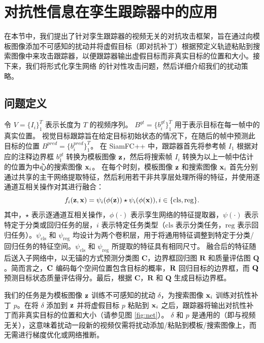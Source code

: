 \section{对抗性信息在孪生跟踪器中的应用}
在本节中，我们提出了针对孪生跟踪器的视频无关的对抗攻击框架，旨在通过向模板图像添加不可感知的扰动并将虚假目标（即对抗补丁）根据预定义轨迹粘贴到搜索图像中来攻击跟踪器，以便跟踪器输出虚假目标而非真实目标的位置和大小。接下来，我们将形式化孪生网络 \cite{SiamFC++} 的针对性攻击问题，然后详细介绍我们的扰动策略。

\subsection{问题定义}
令 $V=\{I_i\}_1^T$ 表示长度为 $T$ 的视频序列。
$B^{gt}=\{b^{gt}_i\}_1^T$ 用于表示目标在每一帧中的真实位置。
视觉目标跟踪旨在给定目标初始状态的情况下，在随后的帧中预测此目标的位置 $B^{pred}=\{b^{pred}_i\}_1^T$。
在 SiamFC++ 中，跟踪器首先将参考帧 $I_1$ 根据对应的注释边界框 $b_1^{gt}$ 转换为模板图像 $\textbf z$，然后将搜索帧 $I_i$ 转换为以上一帧中估计的位置为中心的搜索图像 $\textbf x_i$。
在每个时刻，模板图像 $\textbf z$ 和搜索图像 $\textbf x_i$ 首先分别通过共享的主干网络提取特征，然后利用若干非共享层处理所得的特征，并使用逐通道互相关操作对其进行融合：
\begin{equation}
f_{i}(\textbf z, \textbf x)=\psi_{i}(\phi(\textbf z)) \star \psi_{i}(\phi(\textbf x)), i \in\{\mathrm{cls}, \mathrm{reg}\}.
\end{equation}
其中，$\star$ 表示逐通道互相关操作，$\phi(\cdot)$ 表示孪生网络的特征提取器，$\psi(\cdot)$ 表示特定于分类或回归任务的层，$i$ 表示特定任务类型（$\mathrm{cls}$ 表示分类任务，$\mathrm{reg}$ 表示回归任务）。$\psi_{\mathrm{cls}}$ 和 $\psi_{\mathrm{reg}}$ 均设计为两个卷积层，用于将通用特征调整到特定于分类/回归任务的特征空间。$\psi_{\mathrm{cls}}$ 和 $\psi_{\mathrm{reg}}$ 所提取的特征具有相同尺寸。
融合后的特征随后送入子网络中，以无锚的方式预测分类图 $\textbf{C}$，边界框回归图 $\textbf{R}$ 和质量评估图 $\textbf{Q}$。简而言之，$\textbf C$ 编码每个空间位置包含目标的概率，$\textbf R$ 回归目标的边界框，而 $\textbf Q$ 预测目标状态质量评估得分。最后，根据 $\textbf{C}$，$\textbf{R}$ 和 $\textbf{Q}$ 生成目标边界框。

我们的任务是为模板图像 $\textbf z$ 训练不可感知的扰动 $\delta$，为搜索图像 $\textbf x_i$ 训练对抗性补丁 $p$。在将 $\delta$ 添加到 $\textbf z$ 并将虚假目标 $p$ 粘贴到 $\textbf x_i$ 之后，跟踪器将输出对抗性补丁而非真实目标的位置和大小（请参见图 \ref{fig:net}）。
$\delta$ 和 $p$ 是通用的（即与视频无关），这意味着扰动一段新的视频仅需将扰动添加/粘贴到模板/搜索图像上，而无需进行梯度优化或网络推断。

